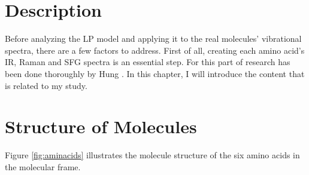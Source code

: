  \label{ch:2}
\section{Description}
Before analyzing the LP model and applying it to the real molecules' vibrational spectra, there are a few factors to address. First of all, creating each amino acid's IR, Raman and SFG spectra is an essential step. For this part of research has been done thoroughly by Hung \cite{KuoKaiHung:Thesis:2015}. In this chapter, I will introduce the content that is related to my study. \\

\section{Structure of Molecules}
Figure \ref{fig:aminacids} illustrates the molecule structure of the six amino acids in the molecular frame.  
